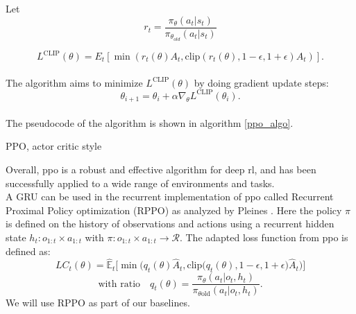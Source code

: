 Let
\begin{equation}
    r_t = \frac{\pi_{\theta}(a_t|s_t)}{\pi_{\theta_{old}}(a_t|s_t)}
\end{equation}

\begin{equation}
        L^{\mathrm{CLIP}}(\theta) = {E}_t \left[ \min \left(r_t(\theta) {A}_t, \text{clip} \left(r_t(\theta), 1-\epsilon, 1+\epsilon \right) {A}_t \right) \right].
\end{equation} \\

The algorithm aims to minimize $L^{\mathrm{CLIP}}(\theta)$ by doing gradient update steps:
\begin{equation}
    \theta_{i+1} = \theta_{i} + \alpha \nabla_{\theta} L^{\mathrm{CLIP}}(\theta_i).
\end{equation}\\

The pseudocode of the algorithm is shown in algorithm \ref{ppo_algo}.
\begin{algorithm}[h]
    \SetAlgoLined
    \caption{PPO, actor critic style}
    \label{ppo_algo}

\end{algorithm}
Overall, \ac{ppo} is a robust and effective algorithm for deep \ac{rl}, and has been successfully applied to a wide range of environments and tasks.\\

A GRU can be used in the recurrent implementation of \ac{ppo} called Recurrent Proximal Policy optimization (RPPO) as analyzed by Pleines \etAl 
\cite{RPPO}. Here the policy $\pi$ is defined on the history of observations and actions using a recurrent hidden state $h_t : o_{1:t} \times a_{1:t}$ with $\pi : o_{1:t} \times a_{1:t} \rightarrow \mathcal{R}$.
The adapted loss function from \ac{ppo} is defined as:
\begin{equation}
    LC_t(\theta) = \widehat{\mathbb{E}}_t\big[\min\big(q_t(\theta)\widehat{A}_t, \text{clip}\big(q_t(\theta), 1 - \epsilon, 1 + \epsilon\big)\widehat{A}_t\big)\big] \tag{1}
\end{equation}
\begin{equation*}
    \text{with ratio} \quad q_t(\theta) = \frac{\pi_{\theta}(a_t \vert o_t, h_t)}{\pi_{\theta \text{old}}(a_t \vert o_t, h_t)}.
\end{equation*}
We will use RPPO as part of our baselines.


